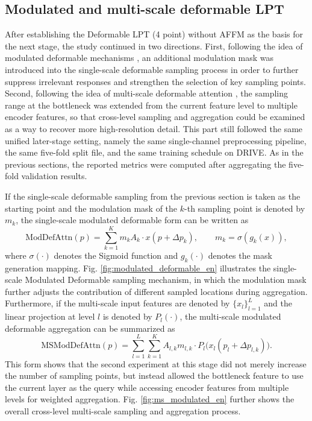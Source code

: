 \documentclass[a4paper,12pt]{article}
\begin{document}
\subsection{Modulated and multi-scale deformable LPT}

After establishing the Deformable LPT (4 point) without AFFM as the basis for the next stage, the study continued in two directions. First, following the idea of modulated deformable mechanisms \cite{zhu2019dcnv2}, an additional modulation mask was introduced into the single-scale deformable sampling process in order to further suppress irrelevant responses and strengthen the selection of key sampling points. Second, following the idea of multi-scale deformable attention \cite{zhu2021deformabledetr}, the sampling range at the bottleneck was extended from the current feature level to multiple encoder features, so that cross-level sampling and aggregation could be examined as a way to recover more high-resolution detail. This part still followed the same unified later-stage setting, namely the same single-channel preprocessing pipeline, the same five-fold split file, and the same training schedule on DRIVE. As in the previous sections, the reported metrics were computed after aggregating the five-fold validation results.

If the single-scale deformable sampling from the previous section is taken as the starting point and the modulation mask of the \(k\)-th sampling point is denoted by \(m_k\), the single-scale modulated deformable form can be written as
\[
\mathrm{ModDefAttn}(p) = \sum_{k=1}^{K} m_k A_k \cdot x(p + \Delta p_k),\qquad
m_k = \sigma(g_k(x)),
\]
where \(\sigma(\cdot)\) denotes the Sigmoid function and \(g_k(\cdot)\) denotes the mask generation mapping. Fig. \ref{fig:modulated_deformable_en} illustrates the single-scale Modulated Deformable sampling mechanism, in which the modulation mask further adjusts the contribution of different sampled locations during aggregation. Furthermore, if the multi-scale input features are denoted by \(\{x_l\}_{l=1}^{L}\) and the linear projection at level \(l\) is denoted by \(P_l(\cdot)\), the multi-scale modulated deformable aggregation can be summarized as
\[
\mathrm{MSModDefAttn}(p) = \sum_{l=1}^{L}\sum_{k=1}^{K} A_{l,k} m_{l,k} \cdot P_l\big(x_l(p_l + \Delta p_{l,k})\big).
\]
This form shows that the second experiment at this stage did not merely increase the number of sampling points, but instead allowed the bottleneck feature to use the current layer as the query while accessing encoder features from multiple levels for weighted aggregation. Fig. \ref{fig:ms_modulated_en} further shows the overall cross-level multi-scale sampling and aggregation process.
\end{document}
